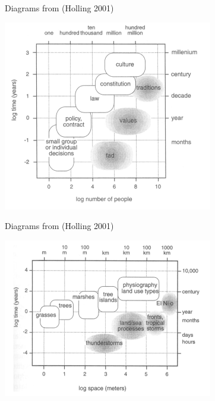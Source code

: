 \documentclass{beamer}
\begin{document}
\begin{frame}{Diagrams from (Holling 2001)}
  \begin{center}
    \includegraphics[width=.75\textwidth]{Holling-2.png}
  \end{center}
\end{frame}

\begin{frame}{Diagrams from (Holling 2001)}
  \begin{center}
    \includegraphics[width=.85\textwidth]{Holling-3.png}
  \end{center}
\end{frame}
\end{document}
